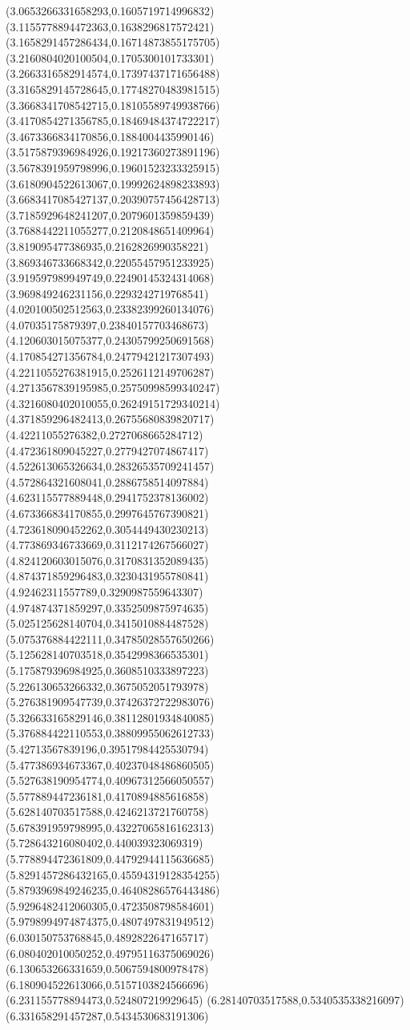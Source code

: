 {(3.0653266331658293,0.1605719714996832)
(3.1155778894472363,0.1638296817572421)
(3.1658291457286434,0.16714873855175705)
(3.2160804020100504,0.1705300101733301)
(3.2663316582914574,0.17397437171656488)
(3.3165829145728645,0.17748270483981515)
(3.3668341708542715,0.18105589749938766)
(3.4170854271356785,0.18469484374722217)
(3.4673366834170856,0.1884004435990146)
(3.5175879396984926,0.19217360273891196)
(3.5678391959798996,0.19601523233325915)
(3.6180904522613067,0.19992624898233893)
(3.6683417085427137,0.20390757456428713)
(3.7185929648241207,0.2079601359859439)
(3.7688442211055277,0.2120848651409964)
(3.819095477386935,0.2162826990358221)
(3.869346733668342,0.22055457951233925)
(3.919597989949749,0.22490145324314068)
(3.969849246231156,0.2293242719768541)
(4.020100502512563,0.23382399260134076)
(4.07035175879397,0.23840157703468673)
(4.120603015075377,0.24305799250691568)
(4.170854271356784,0.24779421217307493)
(4.2211055276381915,0.2526112149706287)
(4.2713567839195985,0.25750998599340247)
(4.3216080402010055,0.26249151729340214)
(4.371859296482413,0.26755680839820717)
(4.42211055276382,0.2727068665284712)
(4.472361809045227,0.2779427074867417)
(4.522613065326634,0.28326535709241457)
(4.572864321608041,0.2886758514097884)
(4.623115577889448,0.2941752378136002)
(4.673366834170855,0.2997645767390821)
(4.723618090452262,0.3054449430230213)
(4.773869346733669,0.3112174267566027)
(4.824120603015076,0.3170831352089435)
(4.874371859296483,0.3230431955780841)
(4.92462311557789,0.3290987559643307)
(4.974874371859297,0.3352509875974635)
(5.025125628140704,0.3415010884487528)
(5.075376884422111,0.34785028557650266)
(5.125628140703518,0.3542998366535301)
(5.175879396984925,0.3608510333897223)
(5.226130653266332,0.3675052051793978)
(5.276381909547739,0.37426372722983076)
(5.326633165829146,0.38112801934840085)
(5.376884422110553,0.38809955062612733)
(5.42713567839196,0.39517984425530794)
(5.477386934673367,0.40237048486860505)
(5.527638190954774,0.40967312566050557)
(5.577889447236181,0.4170894885616858)
(5.628140703517588,0.4246213721760758)
(5.678391959798995,0.43227065816162313)
(5.728643216080402,0.440039323069319)
(5.778894472361809,0.44792944115636685)
(5.8291457286432165,0.45594319128354255)
(5.8793969849246235,0.46408286576443486)
(5.9296482412060305,0.4723508798584601)
(5.9798994974874375,0.4807497831949512)
(6.030150753768845,0.4892822647165717)
(6.080402010050252,0.49795116375069026)
(6.130653266331659,0.5067594800978478)
(6.180904522613066,0.5157103824566696)
(6.231155778894473,0.524807219929645)
(6.28140703517588,0.5340535338216097)
(6.331658291457287,0.5434530683191306)
}
